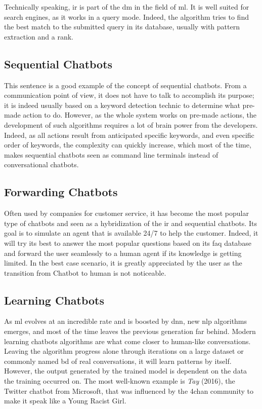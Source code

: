 Technically speaking, \gls{ir} is part of the \gls{dm} in the field of \gls{ml}. It is well suited for search engines, as it works in a query mode. Indeed, the algorithm tries to find the best match to the submitted query in its database, usually with pattern extraction and a rank. 

\subsection{Sequential Chatbots}
This sentence is a good example of the concept of sequential chatbots. From a communication point of view, it does not have to talk to accomplish its purpose; it is indeed usually based on a keyword detection technic to determine what pre-made action to do. However, as the whole system works on pre-made actions, the development of such algorithms requires a lot of brain power from the developers. Indeed, as all actions result from anticipated specific keywords, and even specific order of keywords, the complexity can quickly increase, which most of the time, makes sequential chatbots seen as command line terminals instead of conversational chatbots.

\subsection{Forwarding Chatbots}
Often used by companies for customer service, it has become the most popular type of chatbots and seen as a hybridization of the \gls{ir} and sequential chatbots. Its goal is to simulate an agent that is available 24/7 to help the customer. Indeed, it will try its best to answer the most popular questions based on its \gls{faq} database and forward the user seamlessly to a human agent if its knowledge is getting limited. In the best case scenario, it is greatly appreciated by the user as the transition from Chatbot to human is not noticeable.

\subsection{Learning Chatbots} 
As \gls{ml} evolves at an incredible rate and is boosted by \gls{dnn}, new \gls{nlp} algorithms emerges, and most of the time leaves the previous generation far behind. Modern learning chatbots algorithms are what come closer to human-like conversations. Leaving the algorithm progress alone through iterations on a large dataset or commonly named \gls{bd} of real conversations, it will learn patterns by itself. However, the output generated by the trained model is dependent on the data the training occurred on. The most well-known example is \textit{Tay}\cite{chatbot:tay} (2016), the Twitter chatbot from Microsoft, that was influenced by the 4chan community to make it speak like a Young Racist Girl.\\

